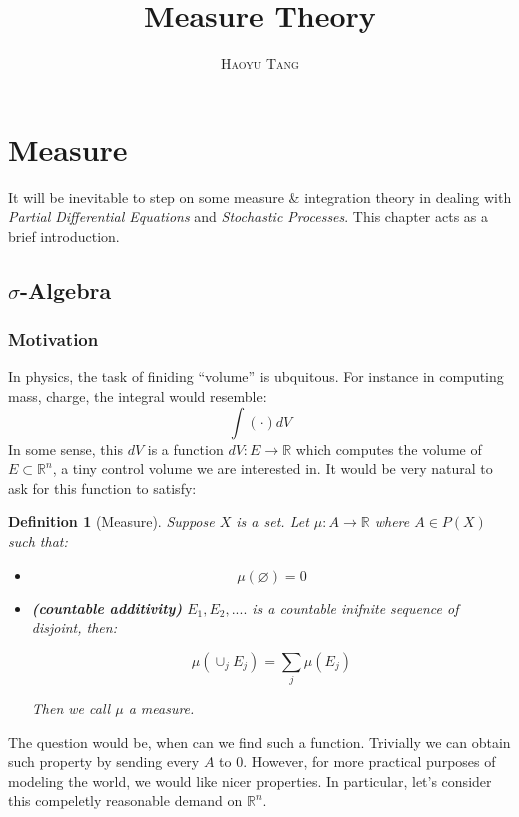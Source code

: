 \documentclass[a4paper,11pt,oneside]{book}
\title{\Huge \textbf{Measure Theory}}
\author{\textsc{Haoyu Tang}}
\newtheorem{definition}{Definition}[section]
\begin{document}
\sloppy

\frontmatter
\maketitle

\tableofcontents

\mainmatter

% 
% 

\section{Measure}

It will be inevitable to step on some measure \& integration theory in dealing with \textit{Partial Differential Equations} and \textit{Stochastic Processes}. This chapter acts as a brief introduction.

\subsection{$\sigma$-Algebra}

\subsubsection{Motivation}

In physics, the task of finiding ``volume'' is ubquitous. For instance in computing mass, charge, the integral would resemble:
\begin{equation}
\int (\cdot ) dV
\end{equation}
In some sense, this $dV$ is a function $dV:E\to \mathbb{R}$ which computes the volume of $E\subset \mathbb{R}^n$, a tiny control volume we are interested in.  It would be very natural to ask for this function to satisfy:

\begin{definition}[Measure]Suppose $X$ is a set. Let $\mu: A \to \mathbb{R}$ where $A\in P(X)$ such that:

\begin{itemize}
\item \begin{equation}
\mu(\varnothing)=0
\end{equation}


\item \textbf{(countable additivity)} $E_1,E_2,....$ is a countable inifnite sequence of disjoint, then:

\begin{equation}
\mu(\cup_j E_j)=\sum_j \mu(E_j)
\end{equation}


Then we call $\mu$ a measure.
\end{itemize}

\end{definition}The question would be, when can we find such a function. Trivially we can obtain such property by sending every $A$ to 0. However, for more practical purposes of modeling the world, we would like nicer properties. In particular, let's consider this compeletly reasonable demand on $\mathbb{R}^n$.
\end{document}

